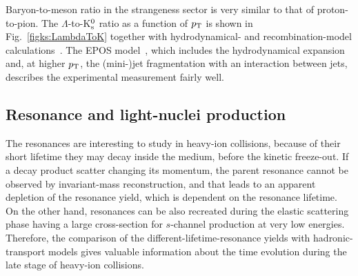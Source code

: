 Baryon-to-meson ratio in the strangeness sector is very similar to that of proton-to-pion. The $\Lambda$-to-K$_{\rm s}^0$ ratio as a function of $p_{\rm T}$ is shown in Fig.~\ref{figks:LambdaToK} together with hydrodynamical- and recombination-model calculations~\cite{Song:2007ux,Song:2008si,Song:2011qa}. The EPOS model~\cite{Werner:2012sv}, which includes the hydrodynamical expansion and, at higher $p_{\rm T}$, the (mini-)jet fragmentation with an interaction between jets, describes the experimental measurement fairly well.
\subsection{Resonance and light-nuclei production}
\label{subsecks:resonace}
The resonances are interesting to study in heavy-ion collisions, because of their short lifetime they may decay inside the medium, before the kinetic freeze-out. If a decay product scatter changing its momentum, the parent resonance  cannot be observed by invariant-mass reconstruction, and that leads to an apparent depletion of the resonance yield, which is dependent on the resonance lifetime. On the other hand, resonances can be also recreated during the elastic scattering phase having a large cross-section for $s$-channel production at very low energies. Therefore, the comparison of the different-lifetime-resonance yields with hadronic-transport models gives valuable information about the time evolution during the late stage of heavy-ion collisions.

